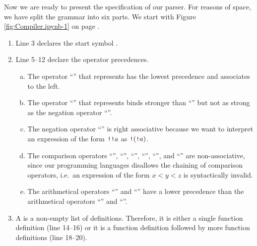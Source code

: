 Now we are ready to present the specification of our parser.  For reasons of space,
we have split the grammar into six parts.  We start with Figure \ref{fig:Compiler.ipynb-1} on page
\pageref{fig:Compiler.ipynb-1}.  
\begin{enumerate}
\item Line 3 declares the start symbol .
\item Line 5--12 declare the operator precedences.
  \begin{enumerate}[(a)]
  \item The operator ``\mytt{||}'' that represents  has the lowest precedence and associates
        to the left.  
  \item The operator ``\mytt{\&\&}'' that represents  binds stronger than ``\mytt{||}''
        but not as strong as  the negation operator ``\mytt{!}''.
  \item The negation operator ``\mytt{!}'' is right associative because we want to interpret an expression of
        the form $\mytt{!!}a$ as  $\mytt{!}(\mytt{!}a)$.
  \item The comparison operators ``\mytt{==}'', ``\mytt{!=}'', ``\mytt{<=}'', ``\mytt{>=}'',
        ``\mytt{<}'', and ``\mytt{>}'' are non-associative, since our programming languages disallows 
        the chaining of comparison operators, i.e.~an expression of the form $x < y < z$ is syntactically
        invalid.
  \item The arithmetical operators ``\mytt{+}'' and ``\mytt{-}'' have a lower precedence than the
        arithmetical operators ``\mytt{*}'' and ``\mytt{/}''. 
  \end{enumerate}
\item A  is a non-empty list of  definitions.  Therefore, it is either a single
      function definition (line 14--16) or it is a function definition followed by more function definitions
      (line 18--20).


\end{enumerate}
